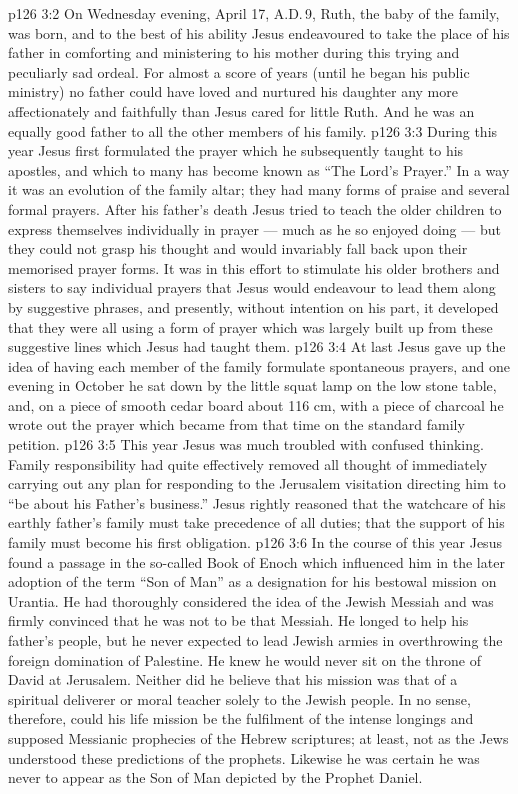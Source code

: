 \vs p126 3:2 On Wednesday evening, April 17, A.D.\,9, Ruth, the baby of the family, was born, and to the best of his ability Jesus endeavoured to take the place of his father in comforting and ministering to his mother during this trying and peculiarly sad ordeal. For almost a score of years (until he began his public ministry) no father could have loved and nurtured his daughter any more affectionately and faithfully than Jesus cared for little Ruth. And he was an equally good father to all the other members of his family.
\vs p126 3:3 \pc During this year Jesus first formulated the prayer which he subsequently taught to his apostles, and which to many has become known as “The Lord’s Prayer.” In a way it was an evolution of the family altar; they had many forms of praise and several formal prayers. After his father’s death Jesus tried to teach the older children to express themselves individually in prayer --- much as he so enjoyed doing --- but they could not grasp his thought and would invariably fall back upon their memorised prayer forms. It was in this effort to stimulate his older brothers and sisters to say individual prayers that Jesus would endeavour to lead them along by suggestive phrases, and presently, without intention on his part, it developed that they were all using a form of prayer which was largely built up from these suggestive lines which Jesus had taught them.
\vs p126 3:4 At last Jesus gave up the idea of having each member of the family formulate spontaneous prayers, and one evening in October he sat down by the little squat lamp on the low stone table, and, on a piece of smooth cedar board about 116 cm, with a piece of charcoal he wrote out the prayer which became from that time on the standard family petition.
\vs p126 3:5 \pc This year Jesus was much troubled with confused thinking. Family responsibility had quite effectively removed all thought of immediately carrying out any plan for responding to the Jerusalem visitation directing him to “be about his Father’s business.” Jesus rightly reasoned that the watchcare of his earthly father’s family must take precedence of all duties; that the support of his family must become his first obligation.
\vs p126 3:6 \pc In the course of this year Jesus found a passage in the so\hyp{}called Book of Enoch which influenced him in the later adoption of the term “Son of Man” as a designation for his bestowal mission on Urantia. He had thoroughly considered the idea of the Jewish Messiah and was firmly convinced that he was not to be that Messiah. He longed to help his father’s people, but he never expected to lead Jewish armies in overthrowing the foreign domination of Palestine. He knew he would never sit on the throne of David at Jerusalem. Neither did he believe that his mission was that of a spiritual deliverer or moral teacher solely to the Jewish people. In no sense, therefore, could his life mission be the fulfilment of the intense longings and supposed Messianic prophecies of the Hebrew scriptures; at least, not as the Jews understood these predictions of the prophets. Likewise he was certain he was never to appear as the Son of Man depicted by the Prophet Daniel.
